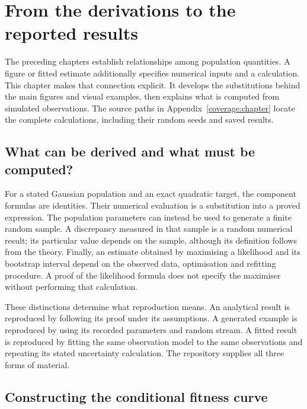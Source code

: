 \chapter{From the derivations to the reported results}
\label{worked:chapter}

The preceding chapters establish relationships among population quantities. A figure or fitted estimate additionally specifies numerical inputs and a calculation. This chapter makes that connection explicit. It develops the substitutions behind the main figures and visual examples, then explains what is computed from simulated observations. The source paths in Appendix~\ref{coverage:chapter} locate the complete calculations, including their random seeds and saved results.

\section{What can be derived and what must be computed?}
\label{worked:status}

For a stated Gaussian population and an exact quadratic target, the component formulas are identities. Their numerical evaluation is a substitution into a proved expression. The population parameters can instead be used to generate a finite random sample. A discrepancy measured in that sample is a random numerical result; its particular value depends on the sample, although its definition follows from the theory. Finally, an estimate obtained by maximising a likelihood and its bootstrap interval depend on the observed data, optimisation and refitting procedure. A proof of the likelihood formula does not specify the maximiser without performing that calculation.

These distinctions determine what reproduction means. An analytical result is reproduced by following its proof under its assumptions. A generated example is reproduced by using its recorded parameters and random stream. A fitted result is reproduced by fitting the same observation model to the same observations and repeating its stated uncertainty calculation. The repository supplies all three forms of material.

\section{Constructing the conditional fitness curve}
\label{worked:main1}

